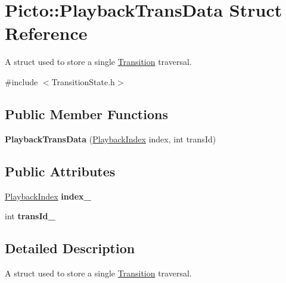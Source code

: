 \hypertarget{struct_picto_1_1_playback_trans_data}{\section{Picto\-:\-:Playback\-Trans\-Data Struct Reference}
\label{struct_picto_1_1_playback_trans_data}
}


A struct used to store a single \hyperlink{class_picto_1_1_transition}{Transition} traversal.  




{\ttfamily \#include $<$Transition\-State.\-h$>$}

\subsection*{Public Member Functions}
\begin{DoxyCompactItemize}
\item 
\hypertarget{struct_picto_1_1_playback_trans_data_a87cb58ed3094243b0c7585d8ccbabf5c}{{\bfseries Playback\-Trans\-Data} (\hyperlink{struct_picto_1_1_playback_index}{Playback\-Index} index, int trans\-Id)}\label{struct_picto_1_1_playback_trans_data_a87cb58ed3094243b0c7585d8ccbabf5c}

\end{DoxyCompactItemize}
\subsection*{Public Attributes}
\begin{DoxyCompactItemize}
\item 
\hypertarget{struct_picto_1_1_playback_trans_data_ab697a8ad44aba3a46b3319ee5dbd45c6}{\hyperlink{struct_picto_1_1_playback_index}{Playback\-Index} {\bfseries index\-\_\-}}\label{struct_picto_1_1_playback_trans_data_ab697a8ad44aba3a46b3319ee5dbd45c6}

\item 
\hypertarget{struct_picto_1_1_playback_trans_data_a7b893d3de8ef330124406470f28f51da}{int {\bfseries trans\-Id\-\_\-}}\label{struct_picto_1_1_playback_trans_data_a7b893d3de8ef330124406470f28f51da}

\end{DoxyCompactItemize}


\subsection{Detailed Description}
A struct used to store a single \hyperlink{class_picto_1_1_transition}{Transition} traversal. 

